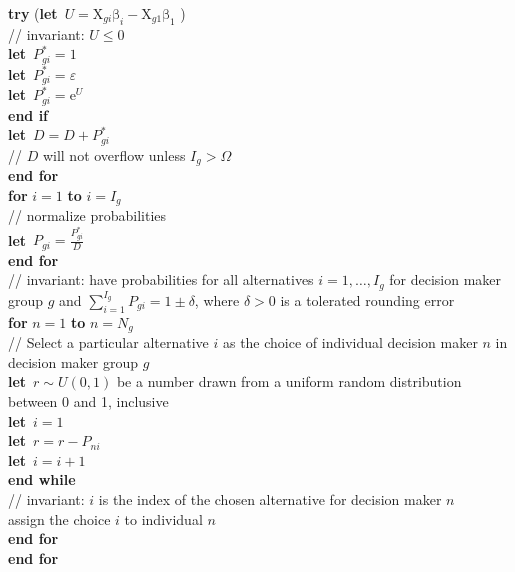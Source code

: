 \documentclass[12pt]{article}
\newcommand{\vc}[1]{\boldsymbol{\mathrm{#1}}}
\newcommand{\e}{\mathrm{e}}
\renewcommand{\algforto}[2]{\textbf{for } #1 \textbf{ to } #2\\\algbegin}
\newcommand{\algendfor}{\algend \textbf{end for}\\}
\newcommand{\algendif}{\algend \textbf{end if}\\}
\newcommand{\algendwhile}{\algend \textbf{end while}\\}
\newcommand{\alglet}{\mbox{\textbf{let }}}
\newcommand{\algtry}[1]{\textbf{try } #1}
\begin{document}
\begin{algtab}
		\algtry{(\alglet $U = \vc{X}_{gi}\vc{\beta}_{i} - 
			\vc{X}_{g1}\vc{\beta}_{1}$ )} \\
		// invariant: $U \leq 0$ \\
			\alglet $P^*_{gi} = 1$ \\
			\alglet $P^*_{gi} = \varepsilon$ \\
		\algelse
			\alglet $P^*_{gi} = \e^{U}$ \\
		\algendif
		\alglet $D = D + P^*_{gi}$ \\
		// $D$ will not overflow unless $I_g > \Omega$ \\

	\algendfor
	\algforto{$i=1$}{$i=I_g$}
		// normalize probabilities \\
		\alglet $P_{gi} = \frac{P^*_{gi}}{D}$ \\
	\algendfor
	// invariant: have probabilities for all alternatives
    	$i=1,\ldots,I_g$ for decision maker group $g$ and $\sum_{i=1}^{I_g}
    	P_{gi}=1\pm\delta$, where $\delta>0$ is a tolerated rounding error \\

	\algforto{$n=1$}{$n=N_g$}
		// Select a particular alternative $i$ as the choice of individual decision
		maker $n$ in decision maker group $g$ \\
		\alglet $r\sim U(0,1)$ be a number drawn from a uniform random distribution
			between 0 and 1, inclusive \\
		\alglet $i=1$ \\
			\alglet $r = r - P_{ni}$ \\
			\alglet $i = i + 1$ \\
		\algendwhile
		// invariant: $i$ is the index of the chosen alternative for decision
			maker $n$\\
		assign the choice $i$ to individual $n$ \\
	\algendfor
\algendfor
	
\end{algtab}
\end{document}
